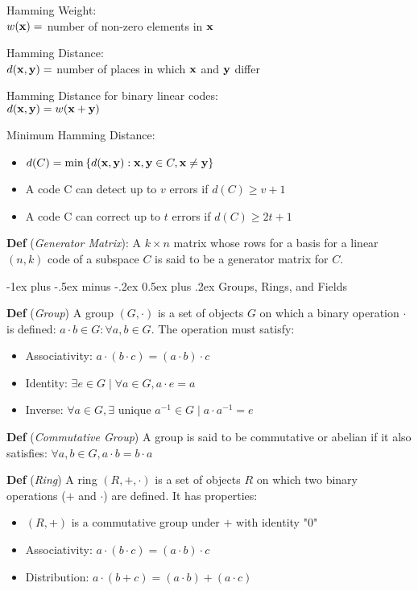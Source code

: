 \documentclass[12pt,landscape]{article}
\makeatletter
\renewcommand{\section}{\@startsection{section}{1}{0mm}%
                                {-1ex plus -.5ex minus -.2ex}%
                                {0.5ex plus .2ex}%
                                {\normalfont\normalsize\bfseries}}
\newcommand{\tab}{\hspace{.02\textwidth}}
\newcommand{\defn}[1]{\textbf{Def} (\emph{#1})}
\newcommand{\set}[1]{\left\{ #1 \right\}}
\makeatother
\begin{document}
\begin{multicols*}{3}
Hamming Weight:\\
\tab $w(\vb{x}) =$ number of non-zero elements in $\vb{x}$

Hamming Distance:\\
\tab $d(\vb{x}, \vb{y}) =$ number of places in which $\vb{x}$ and $\vb{y}$ differ

Hamming Distance for binary linear codes:\\
\tab $d(\vb{x}, \vb{y}) = w(\vb{x} + \vb{y})$

Minimum Hamming Distance:\\
\begin{itemize}[itemsep=0em]
    \item $d(C) = \min{\set{d(\vb{x}, \vb{y}) : \vb{x}, \vb{y} \in C, \vb{x} \neq \vb{y}}}$
    \item A code C can detect up to $v$ errors if $d(C) \geq v + 1$
    \item A code C can correct up to $t$ errors if $d(C) \geq 2t + 1$
\end{itemize}

\defn{Generator Matrix}: A $k\times n$ matrix whose rows for a basis for a linear $(n,k)$ code of a subspace $C$ is said to be a generator matrix for $C$.

\section{Groups, Rings, and Fields}

\defn{Group} A group $(G, \cdot)$ is a set of objects $G$ on which a binary operation $\cdot$ is defined: $a \cdot b \in G : \forall a,b \in G$. The operation must satisfy:
\begin{itemize}[itemsep=0em]
    \item Associativity: $a \cdot (b \cdot c) = (a \cdot b) \cdot c$
    \item Identity: $\exists e \in G \mid \forall a \in G, a \cdot e = a$
    \item Inverse: $\forall a \in G, \exists \text{ unique } a^{-1} \in G \mid a \cdot a^{-1} = e$
\end{itemize}

\defn{Commutative Group} A group is said to be commutative or abelian if it also satisfies: $\forall a,b \in G, a \cdot b = b \cdot a$

\defn{Ring} A ring $(R, +, \cdot)$ is a set of objects $R$ on which two binary operations ($+$ and $\cdot$) are defined. It has properties:
\begin{itemize}[itemsep=0em]
    \item $(R, +)$ is a commutative group under $+$ with identity "$0$"
    \item Associativity: $a \cdot (b \cdot c) = (a \cdot b) \cdot c$
    \item Distribution: $a \cdot (b + c) = (a \cdot b) + (a \cdot c)$
\end{itemize}


\end{multicols*}
\end{document}
